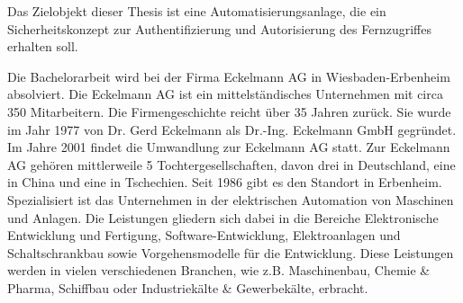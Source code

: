 \documentclass[11pt,a4paper]{report}
\begin{document}
Das Zielobjekt dieser Thesis ist eine Automatisierungsanlage, die ein Sicherheitskonzept zur Authentifizierung und Autorisierung des Fernzugriffes erhalten soll.

Die Bachelorarbeit wird bei der Firma Eckelmann AG in Wiesbaden-Erbenheim absolviert. Die Eckelmann AG ist ein mittelständisches Unternehmen mit circa 350 Mitarbeitern. Die Firmengeschichte reicht über 35 Jahren zurück. Sie wurde im Jahr 1977 von Dr. Gerd Eckelmann als  Dr.-Ing. Eckelmann GmbH gegründet. Im Jahre 2001 findet die Umwandlung zur Eckelmann AG statt. Zur Eckelmann AG gehören mittlerweile 5 Tochtergesellschaften, davon drei in Deutschland, eine in China und eine in Tschechien. Seit 1986 gibt es den Standort in Erbenheim. Spezialisiert ist das Unternehmen in der elektrischen Automation von Maschinen und Anlagen. Die Leistungen gliedern sich dabei in die Bereiche Elektronische Entwicklung und Fertigung, Software-Entwicklung, Elektroanlagen und Schaltschrankbau sowie Vorgehensmodelle für die Entwicklung. Diese Leistungen werden in vielen verschiedenen Branchen, wie z.B. Maschinenbau, Chemie \& Pharma, Schiffbau oder Industriekälte \& Gewerbekälte, erbracht.
\end{document}
